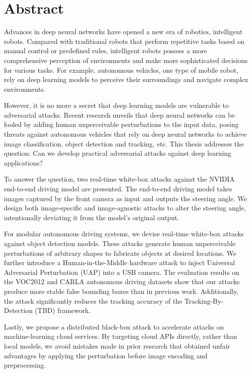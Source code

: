 \chapter*{Abstract}

Advances in deep neural networks have opened a new era of robotics, intelligent robots. Compared with traditional robots that perform repetitive tasks based on manual control or predefined rules, intelligent robots possess a more comprehensive perception of environments and make more sophisticated decisions for various tasks. For example, autonomous vehicles, one type of mobile robot, rely on deep learning models to perceive their surroundings and navigate complex environments.

However, it is no more a secret that deep learning models are vulnerable to adversarial attacks. Recent research unveils that deep neural networks can be fooled by adding human unperceivable perturbations to the input data, posing threats against autonomous vehicles that rely on deep neural networks to achieve image classification, object detection and tracking, etc. This thesis addresses the question: Can we develop practical adversarial attacks against deep learning applications? 



To answer the question, two real-time white-box attacks against the NVIDIA end-to-end driving model are presented. The end-to-end driving model takes images captured by the front camera as input and outputs the steering angle. We design both image-specific and image-agnostic attacks to alter the steering angle, intentionally deviating it from the model’s original output.

For modular autonomous driving systems, we devise real-time white-box attacks against object detection models. These attacks generate human unperceivable perturbations of arbitrary shapes to fabricate objects at desired locations. We further introduce a Human-in-the-Middle hardware attack to inject Universal Adversarial Perturbation (UAP) into a USB camera. The evaluation results on the VOC2012 and CARLA autonomous driving datasets show that our attacks produce more stable false bounding boxes than in previous work. Additionally, the attack significantly reduces the tracking accuracy of the Tracking-By-Detection (TBD) framework.

Lastly, we propose a distributed black-box attack to accelerate attacks on machine-learning cloud services. By targeting cloud APIs directly, rather than local models, we avoid mistakes made in prior research that obtained unfair advantages by applying the perturbation before image encoding and preprocessing.
